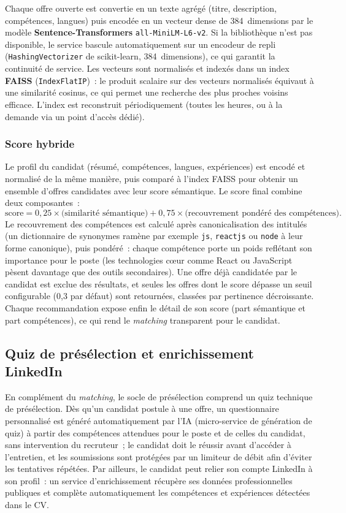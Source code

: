 Chaque offre ouverte est convertie en un texte agrégé (titre, description, compétences,
langues) puis encodée en un vecteur dense de 384~dimensions par le modèle
\textbf{Sentence-Transformers} \texttt{all-MiniLM-L6-v2}. Si la bibliothèque n'est pas
disponible, le service bascule automatiquement sur un encodeur de repli
(\texttt{HashingVectorizer} de scikit-learn, 384~dimensions), ce qui garantit la continuité de
service. Les vecteurs sont normalisés et indexés dans un index \textbf{FAISS}
(\texttt{IndexFlatIP})~: le produit scalaire sur des vecteurs normalisés équivaut à une
similarité cosinus, ce qui permet une recherche des plus proches voisins efficace. L'index est
reconstruit périodiquement (toutes les heures, ou à la demande via un point d'accès dédié).

\subsubsection{Score hybride}

Le profil du candidat (résumé, compétences, langues, expériences) est encodé et normalisé de la
même manière, puis comparé à l'index FAISS pour obtenir un ensemble d'offres candidates avec
leur score sémantique. Le score final combine deux composantes~:
\[
  \text{score} = 0{,}25 \times \text{(similarité sémantique)} + 0{,}75 \times \text{(recouvrement pondéré des compétences)}.
\]
Le recouvrement des compétences est calculé après canonicalisation des intitulés (un
dictionnaire de synonymes ramène par exemple \texttt{js}, \texttt{reactjs} ou \texttt{node} à
leur forme canonique), puis pondéré~: chaque compétence porte un poids reflétant son importance
pour le poste (les technologies cœur comme React ou JavaScript pèsent davantage que des outils
secondaires). Une offre déjà candidatée par le candidat est exclue des résultats, et seules les
offres dont le score dépasse un seuil configurable (0{,}3 par défaut) sont retournées, classées
par pertinence décroissante. Chaque recommandation expose enfin le détail de son score
(part sémantique et part compétences), ce qui rend le \textit{matching} transparent pour le
candidat.

\subsection{Quiz de présélection et enrichissement LinkedIn}

En complément du \textit{matching}, le socle de présélection comprend un quiz technique de présélection. Dès qu'un candidat postule à une offre, un questionnaire personnalisé est généré automatiquement par l'IA (micro-service de génération de quiz) à partir des compétences attendues pour le poste et de celles du candidat, sans intervention du recruteur~; le candidat doit le réussir avant d'accéder à l'entretien, et les soumissions sont protégées par un limiteur de débit afin d'éviter les tentatives répétées. Par ailleurs, le candidat peut relier son compte LinkedIn à son profil~: un service d'enrichissement récupère ses données professionnelles publiques et complète automatiquement les compétences et expériences détectées dans le CV.

